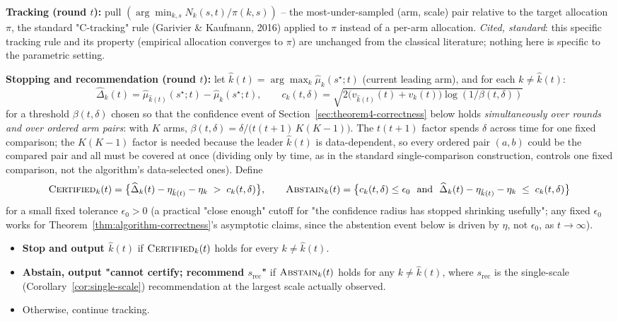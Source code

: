\textbf{Tracking (round $t$):} pull $(\arg\min_{k,s} N_k(s,t) / \pi(k,s))$ -- the
most-under-sampled (arm, scale) pair relative to the target allocation $\pi$, the
standard "C-tracking" rule (Garivier \& Kaufmann, 2016) applied to $\pi$ instead of a
per-arm allocation. \emph{Cited, standard}: this specific tracking rule and its
property (empirical allocation converges to $\pi$) are unchanged from the classical
literature; nothing here is specific to the parametric setting.

\textbf{Stopping and recommendation (round $t$):} let $\hat{k}(t) = \arg\max_k
\hat\mu_k(s^\star; t)$ (current leading arm), and for each $k \ne \hat{k}(t)$:
\[
  \widehat{\Delta}_k(t) = \hat\mu_{\hat{k}(t)}(s^\star;t) - \hat\mu_k(s^\star;t), \qquad
  c_k(t, \delta) = \sqrt{2\big(v_{\hat{k}(t)}(t) + v_k(t)\big) \log(1/\beta(t,\delta))}
\]
for a threshold $\beta(t,\delta)$ chosen so that the confidence event of
Section~\ref{sec:theorem4-correctness} below holds \emph{simultaneously over rounds and over
ordered arm pairs}: with $K$ arms,
$\beta(t,\delta) = \delta / \big(t(t+1)\,K(K-1)\big)$. The $t(t+1)$ factor spends $\delta$
across time for one fixed comparison; the $K(K-1)$ factor is needed because the
leader $\hat{k}(t)$ is data-dependent, so every ordered pair $(a,b)$ could be the
compared pair and all must be covered at once (dividing only by time, as in the standard
single-comparison construction, controls one fixed comparison, not the algorithm's
data-selected ones). Define
\[
  \textsc{Certified}_k(t) = \big\{ \widehat{\Delta}_k(t) - \eta_{\hat{k}(t)} - \eta_k
    \;>\; c_k(t,\delta) \big\}, \qquad
  \textsc{Abstain}_k(t) = \big\{ c_k(t,\delta) \le \epsilon_0 \ \text{ and }\
    \widehat{\Delta}_k(t) - \eta_{\hat{k}(t)} - \eta_k \;\le\; c_k(t,\delta) \big\}
\]
for a small fixed tolerance $\epsilon_0 > 0$ (a practical "close enough" cutoff for
"the confidence radius has stopped shrinking usefully"; any fixed $\epsilon_0$ works for
Theorem~\ref{thm:algorithm-correctness}'s asymptotic claims, since the abstention event
below is driven by $\eta$, not $\epsilon_0$, as $t \to \infty$).
\begin{itemize}
  \item \textbf{Stop and output $\hat{k}(t)$} if $\textsc{Certified}_k(t)$ holds for
    every $k \ne \hat{k}(t)$.
  \item \textbf{Abstain, output "cannot certify; recommend $s_{\mathrm{rec}}$"} if
    $\textsc{Abstain}_k(t)$ holds for any $k \ne \hat{k}(t)$, where $s_{\mathrm{rec}}$ is
    the single-scale (Corollary~\ref{cor:single-scale}) recommendation at the largest
    scale actually observed.
  \item Otherwise, continue tracking.
\end{itemize}

